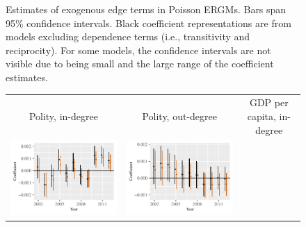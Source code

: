 \documentclass[reqno,onecolumn,letterpaper,12pt]{article}
\begin{document}
\begin{figure}[htp]
\begin{tabular}{@{\hskip -.05cm}c@{\hskip -.2cm}c@{\hskip -.2cm}c}
\end{tabular}
\caption{\label{fig:edge_controls} Estimates of exogenous edge terms in Poisson ERGMs. Bars span 95\% confidence intervals. Black coefficient representations are from models excluding dependence terms (i.e., transitivity and reciprocity). For some models, the confidence intervals are not visible due to being small and the large range of the coefficient estimates.}
\end{figure}

\begin{figure}[htp]
\centering
\begin{tabular}{@{\hskip -.05cm}c@{\hskip -.2cm}c@{\hskip -.2cm}c}
Polity, in-degree &
Polity, out-degree &
GDP per capita, in-degree \\
\includegraphics[height=.165\textheight, clip=true, trim=.5cm .5cm 0cm .1cm]{figures/main_rl_plots/Dest_Polity.pdf} &
\includegraphics[height=.165\textheight, clip=true, trim=.5cm .5cm 0cm .1cm]{figures/main_rl_plots/Origin_Polity.pdf}  &

\end{tabular}
\end{figure}
\end{document}
